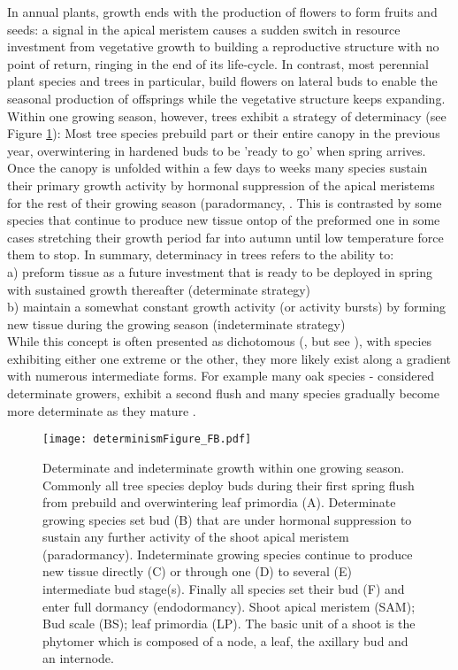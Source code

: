 \documentclass{article}
\begin{document}
In annual plants, growth ends with the production of flowers to form fruits and seeds: a signal in the apical meristem causes a sudden switch in resource investment from vegetative growth to building a reproductive structure with no point of return, ringing in the end of its life-cycle. In contrast, most perennial plant species and trees in particular, build flowers on lateral buds to enable the seasonal production of offsprings while the vegetative structure keeps expanding. \\

Within one growing season, however, trees exhibit a strategy of determinacy (see Figure \ref{fig:fig_2xxx}): Most tree species prebuild part or their entire canopy in the previous year, overwintering in hardened buds to be 'ready to go' when spring arrives. Once the canopy is unfolded within a few days to weeks many species sustain their primary growth activity by hormonal suppression of the apical meristems for the rest of their growing season (paradormancy, \citep{langEndoParaEcodormancy1987}. This is contrasted by some species that continue to produce new tissue ontop of the preformed one in some cases stretching their growth period far into autumn until low temperature force them to stop. In summary, determinacy in trees refers to the ability to:\\
a) preform tissue as a future investment that is ready to be deployed in spring with sustained growth thereafter (determinate strategy)\\
b) maintain a somewhat constant growth activity (or activity bursts) by forming new tissue during the growing season (indeterminate strategy)\\

While this concept is often presented as dichotomous (\cite{kozlowskiGrowthControlWoody1997, lechowiczWhyTemperateDeciduous1984a}, but see \citet{kikuzawaLeafSurvivalWoody1983}), with species exhibiting either one extreme or the other, they more likely exist along a gradient with numerous intermediate forms. For example many oak species - considered determinate growers, exhibit a second flush and many species gradually become more determinate as they mature \citep{borchertConceptJuvenilityWoody1976, heuretOntogeneticTrendsMorphological2006}.
	
	
								\begin{figure}
								\centering
								\texttt{[image: determinismFigure\_FB.pdf]} 
								\caption{Determinate and indeterminate growth within one growing season. Commonly all tree species deploy buds during their first spring flush from prebuild and overwintering leaf primordia (A). Determinate growing species set bud (B) that are under hormonal suppression to sustain any further activity of the shoot apical meristem (paradormancy). Indeterminate growing species continue to produce new tissue directly (C) or through one (D) to several (E) intermediate bud stage(s). Finally all species set their bud (F) and enter full dormancy (endodormancy). Shoot apical meristem (SAM); Bud scale (BS); leaf primordia (LP). The basic unit of a shoot is the phytomer which is composed of a node, a leaf, the axillary bud and an internode.}
								\label{fig:fig_2xxx}
								\end{figure}
	
\end{document}

